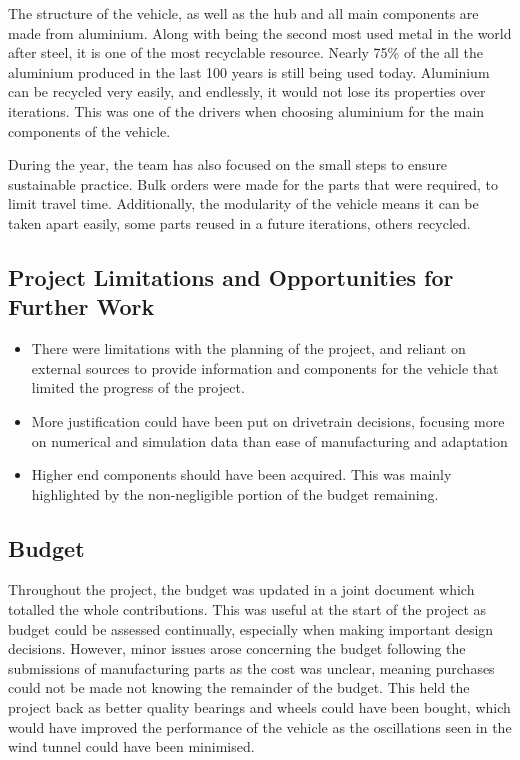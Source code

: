 The structure of the vehicle, as well as the hub and all main components are made from aluminium. Along with being the second most used metal in the world after steel, it is one of the most recyclable resource. Nearly 75\% of the all the aluminium produced in the last 100 years is still being used today. Aluminium can be recycled very easily, and endlessly, it would not lose its properties over iterations. This was one of the drivers when choosing aluminium for the main components of the vehicle.

During the year, the team has also focused on the small steps to ensure sustainable practice. Bulk orders were made for the parts that were required, to limit travel time. Additionally, the modularity of the vehicle means it can be taken apart easily, some parts reused in a future iterations, others recycled.

\subsection{Project Limitations and Opportunities for Further Work}
\begin{itemize}
    \item There were limitations with the planning of the project, and reliant on external sources to provide information and components for the vehicle that limited the progress of the project.
    \item More justification could have been put on drivetrain decisions, focusing more on numerical and simulation data than ease of manufacturing and adaptation
    \item Higher end components should have been acquired. This was mainly highlighted by the non-negligible portion of the budget remaining. 
\end{itemize}

\subsection{Budget}

Throughout the project, the budget was updated in a joint document which totalled the whole contributions. This was useful at the start of the project as budget could be assessed continually, especially when making important design decisions. However, minor issues arose concerning the budget following the submissions of manufacturing parts as the cost was unclear, meaning purchases could not be made not knowing the remainder of the budget. This held the project back as better quality bearings and wheels could have been bought, which would have improved the performance of the vehicle as the oscillations seen in the wind tunnel could have been minimised.

